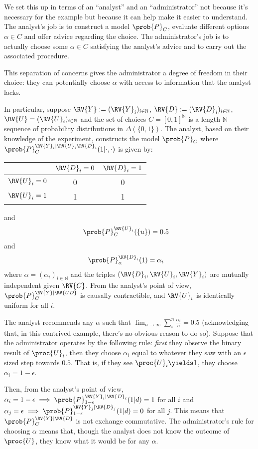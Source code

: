 \begin{example}\label{ex:confounding}
We set this up in terms of an ``analyst'' and an ``administrator'' not because it's necessary for the example but because it can help make it easier to understand. The analyst's job is to construct a model $\prob{P}_C$, evaluate different options $\alpha\in C$ and offer advice regarding the choice. The administrator's job is to actually choose some $\alpha\in C$ satisfying the analyst's advice and to carry out the associated procedure.

This separation of concerns gives the administrator a degree of freedom in their choice: they can potentially choose $\alpha$ with access to information that the analyst lacks.

In particular, suppose $\RV{Y}:=(\RV{Y}_i)_{i\in \mathbb{N}}$, $\RV{D}:=(\RV{D}_i)_{i\in \mathbb{N}}$, $\RV{U}=(\RV{U}_i)_{i\in\mathbb{N}}$ and the set of choices $C=[0,1]^{\mathbb{N}}$ is a length $\mathbb{N}$ sequence of probability distributions in $\Delta(\{0,1\})$. The analyst, based on their knowledge of the experiment, constructs the model $\prob{P}_C$ where $\prob{P}_C^{\RV{Y}_i|\RV{U}_i\RV{D}_i}(1|\cdot,\cdot)$ is given by:
\begin{center}
\begin{tabular}{ c | c | c }
  & $\RV{D}_i=0$ & $\RV{D}_i=1$ \\\hline 
 $\RV{U}_i=0$ & 0 & 0 \\ \hline 
 $\RV{U}_i=1$ & 1 & 1   
\end{tabular}
\end{center}
and 
\begin{align}
    \prob{P}_C^{\RV{U}_i}(\{u\}) &= 0.5
\end{align}
and
\begin{align}
    \prob{P}_\alpha^{\RV{D}_i}(1) &= \alpha_i
\end{align}
where $\alpha=(\alpha_i)_{i\in\mathbb{N}}$ and the triples $(\RV{D}_i,\RV{U}_i,\RV{Y}_i)$ are mutually independent given $\RV{C}$. From the analyst's point of view, $\prob{P}_C^{\RV{Y}|\RV{UD}}$ is causally contractible, and $\RV{U}_i$ is identically uniform for all $i$. 

The analyst recommends any $\alpha$ such that $\lim_{n\to\infty} \sum_i^n \frac{\alpha_i}{n} = 0.5$ (acknowledging that, in this contrived example, there's no obvious reason to do so). Suppose that the administrator operates by the following rule: \emph{first} they observe the binary result of $\proc{U}_i$, then they choose $\alpha_i$ equal to whatever they saw with an $\epsilon$ sized step towards $0.5$. That is, if they see $\proc{U}_i\yields 1$, they choose $\alpha_i=1-\epsilon$.

Then, from the analyst's point of view, $\alpha_i=1-\epsilon\implies \prob{P}_{1-\epsilon}^{\RV{Y}_i|\RV{D}_i}(1|d) = 1$ for all $i$ and $\alpha_j=\epsilon\implies \prob{P}_{1-\epsilon}^{\RV{Y}_j|\RV{D}_j}(1|d) = 0$ for all $j$. This means that $\prob{P}_C^{\RV{Y}|\RV{D}}$ is not exchange commutative. The administrator's rule for choosing $\alpha$ means that, though the analyst does not know the outcome of $\proc{U}$, they know what it would be for any $\alpha$.
\end{example}


